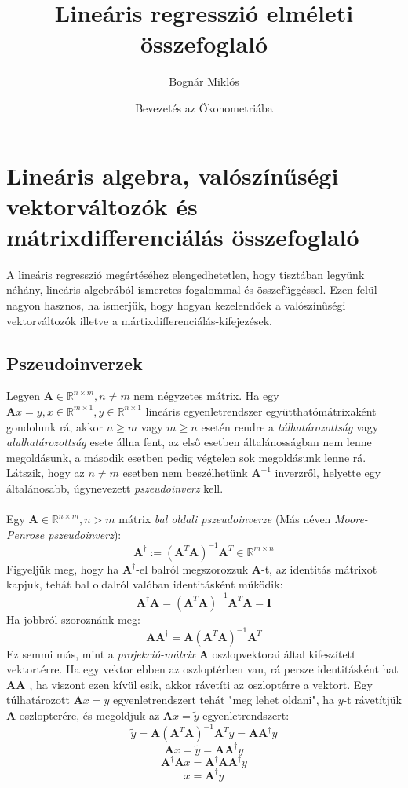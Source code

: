 \documentclass[14p]{report}
\title{Lineáris regresszió elméleti összefoglaló}
\author{Bognár Miklós}
\date{Bevezetés az Ökonometriába}
\def\pmb{\boldsymbol}
\begin{document}
\maketitle
\section{Lineáris algebra, valószínűségi vektorváltozók és mátrixdifferenciálás összefoglaló}
A lineáris regresszió megértéséhez elengedhetetlen, hogy tisztában legyünk néhány, lineáris algebrából ismeretes fogalommal és összefüggéssel. Ezen felül nagyon hasznos, ha ismerjük, hogy hogyan kezelendőek a valószínűségi vektorváltozók illetve a mártixdifferenciálás-kifejezések.  

\subsection{Pszeudoinverzek}
Legyen $\pmb{A} \in \mathbb{R}^{n\times m}, n \ne m$ nem négyzetes mátrix. Ha egy  $\pmb{A}x = y , x \in \mathbb{R}^{m\times 1}, y \in \mathbb{R}^{n \times 1}$ lineáris egyenletrendszer együtthatómátrixaként gondolunk rá, akkor $n \ge m$ vagy $m \ge n$ esetén rendre a \emph{túlhatározottság} vagy \emph{alulhatározottság} esete állna fent, az első esetben általánosságban nem lenne megoldásunk, a második esetben pedig végtelen sok megoldásunk lenne rá. Látszik, hogy az $n \ne m$ esetben nem beszélhetünk $\pmb{A}^{-1}$ inverzről, helyette egy általánosabb, úgynevezett \emph{pszeudoinverz} kell.
\\
\\
Egy $\pmb{A} \in \mathbb{R}^{n \times m}, n > m$ mátrix \emph{bal oldali pszeudoinverze} (Más néven \emph{Moore-Penrose pszeudoinverz}):
\[
	\pmb{A}^{\dagger} := (\pmb{A}^T\pmb{A})^{-1}\pmb{A}^T \in \mathbb{R}^{m \times n}
\]
Figyeljük meg, hogy ha $\pmb{A}^{\dagger}$-el balról megszorozzuk $\pmb{A}$-t, az identitás mátrixot kapjuk, tehát bal oldalról valóban identitásként működik:
\[
	\pmb{A}^{\dagger}\pmb{A} = (\pmb{A}^T\pmb{A})^{-1}\pmb{A}^T\pmb{A} = \pmb{I}
\]
Ha jobbról szoroznánk meg:
\[
	\pmb{A}\pmb{A}^{\dagger} = \pmb{A}(\pmb{A}^T\pmb{A})^{-1}\pmb{A}^T
\]
Ez semmi más, mint a \emph{projekció-mátrix} $\pmb{A}$ oszlopvektorai által kifeszített vektortérre. Ha egy vektor ebben az oszloptérben van, rá persze identitásként hat $\pmb{A}\pmb{A}^{\dagger}$, ha viszont ezen kívül esik, akkor rávetíti az oszloptérre a vektort. Egy túlhatározott $\pmb{A}x = y$ egyenletrendszert tehát "meg lehet oldani", ha $y$-t rávetítjük $\pmb{A}$ oszlopterére, és megoldjuk az $\pmb{A}x = \tilde{y}$ egyenletrendszert: 
\[
	\tilde{y} = \pmb{A}(\pmb{A}^T\pmb{A})^{-1}\pmb{A}^T y = \pmb{A}\pmb{A}^{\dagger} y
\]
\[
	\pmb{A}x = \tilde{y} = \pmb{A}\pmb{A}^{\dagger}y
\]
\[
	\pmb{A}^{\dagger}\pmb{A}x = \pmb{A}^{\dagger}\pmb{A}\pmb{A}^{\dagger}y
\]
\[
	x  = \pmb{A}^{\dagger}y
\]
\end{document}
